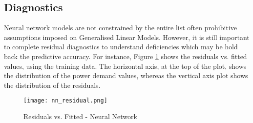 \documentclass[11pt]{article}
\begin{document}
\subsection{Diagnostics}







Neural network models are not constrained by the entire list often prohibitive assumptions imposed on Generalised Linear Models. However, it is still important to complete residual diagnostics to understand deficiencies which may be hold back the predictive accuracy. For instance, Figure \ref{fig:residuals_fitted_nn} shows the residuals vs. fitted values, using the training data. The horizontal axis, at the top of the plot, shows the distribution of the power demand values, whereas the vertical axis plot shows the distribution of the residuals.

\begin{figure}[H]
\centering
\begin{minipage}{.5\textwidth}
  \centering
  \texttt{[image: nn\_residual.png]}
   \caption{Residuals vs. Fitted - Neural Network}
   \label{fig:residuals_fitted_nn}
\end{minipage}%
\end{figure}
\end{document}
